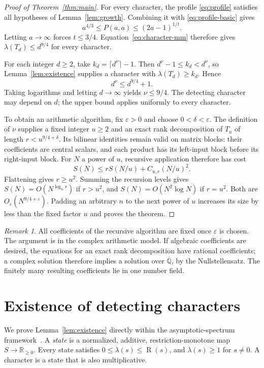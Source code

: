 \documentclass[11pt]{article}
\theoremstyle{definition}
\theoremstyle{remark}
\newtheorem{remark}[theorem]{Remark}
\DeclareMathOperator{\rank}{R}
\newcommand{\R}{\mathbb R}
\newcommand{\eps}{\varepsilon}
\numberwithin{equation}{section}
\begin{document}
\begin{proof}[Proof of Theorem~\ref{thm:main}]
For every character, the profile \eqref{eq:profile} satisfies all
hypotheses of Lemma~\ref{lem:growth}. Combining it with
\eqref{eq:profile-basic} gives
\[
 a^{4/3}\leq P(a,a)\leq(2a-1)^{1/t}.
\]
Letting $a\to\infty$ forces $t\leq3/4$. Equation~\eqref{eq:character-mm}
therefore gives $\lambda(T_d)\leq d^{9/4}$ for every character.

For each integer $d\geq2$, take $k_d=\lceil d^\nu\rceil-1$.
Then $d^\nu-1\leq k_d<d^\nu$, so Lemma~\ref{lem:existence} supplies
a character with $\lambda(T_d)\geq k_d$. Hence
\[
 d^\nu\leq d^{9/4}+1.
\]
Taking logarithms and letting $d\to\infty$ yields $\nu\leq9/4$.
The detecting character may depend on $d$; the upper bound applies
uniformly to every character.

To obtain an arithmetic algorithm, fix $\eps>0$ and choose
$0<\delta<\eps$. The definition of $\nu$ supplies a fixed integer
$u\geq2$ and an exact rank decomposition of $T_u$ of length
$r<u^{9/4+\delta}$. Its bilinear identities remain valid on matrix
blocks: their coefficients are central scalars, and each product has
its left-input block before its right-input block.
For $N$ a power of $u$, recursive application therefore has cost
\[
 S(N)\leq rS(N/u)+C_{u,r}(N/u)^2.
\]
Flattening gives $r\geq u^2$. Summing the recursion levels gives
$S(N)=O(N^{\log_u r})$ if $r>u^2$, and
$S(N)=O(N^2\log N)$ if $r=u^2$. Both are
$O_\eps(N^{9/4+\eps})$. Padding an arbitrary $n$ to the next power
of $u$ increases its size by less than the fixed factor $u$ and
proves the theorem.
\end{proof}

\begin{remark}
All coefficients of the recursive algorithm are fixed once $\eps$ is
chosen. The argument is in the complex arithmetic model. If algebraic
coefficients are desired, the equations for an exact rank decomposition
have rational coefficients; a complex solution therefore implies a
solution over $\overline{\mathbb Q}$, by the Nullstellensatz.
The finitely many resulting coefficients lie in one number field.
\end{remark}

\appendix
\section{Existence of detecting characters}\label{sec:existence}

We prove Lemma~\ref{lem:existence} directly within the
asymptotic-spectrum framework~\cite{Str88,CVZ}.
A \emph{state} is a normalized, additive, restriction-monotone map
$S\to\R_{\geq0}$. Every state satisfies
$0\leq\lambda(s)\leq\rank(s)$, and $\lambda(s)\geq1$ for $s\ne0$.
A character is a state that is also multiplicative.
\end{document}
